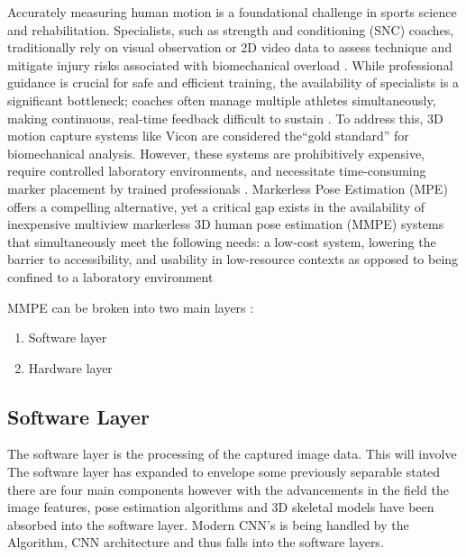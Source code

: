 \renewcommand{\labelenumii}{\arabic{enumi}.\arabic{enumii}}
\renewcommand{\labelenumiii}{\arabic{enumi}.\arabic{enumii}.\arabic{enumiii}}
\renewcommand{\labelenumiv}{\arabic{enumi}.\arabic{enumii}.\arabic{enumiii}.\arabic{enumiv}}

\label{chap:introduction}

\label{sec:background}

Accurately measuring human motion is a foundational challenge in sports science and rehabilitation. Specialists, such as strength and conditioning (SNC) coaches, traditionally rely on visual observation or 2D video data to assess technique and mitigate injury risks associated with biomechanical overload \cite{chariar2023ai,forte2023biomechanics}.
While professional guidance is crucial for safe and efficient training, the availability of specialists is a significant bottleneck; coaches often manage multiple athletes simultaneously, making continuous, real-time feedback difficult to sustain \cite{needham2021accuracy}.
To address this, 3D motion capture systems like Vicon are considered the``gold standard'' for biomechanical analysis\cite{matsuda2025reliability, hansen2024validation, song2022evolution}.
However, these systems are prohibitively expensive, require controlled laboratory environments, and necessitate time-consuming marker placement by trained professionals \cite{mercadal2024exercise,kuster2016accuracy}.
Markerless Pose Estimation (MPE) offers a compelling alternative, yet a critical gap exists in the availability of inexpensive multiview markerless 3D human pose estimation (MMPE) systems that simultaneously meet the following needs: a low-cost system, lowering the barrier to accessibility, and usability in low-resource contexts as opposed to being confined to a laboratory environment 

MMPE can be broken into two main layers \cite{wade2022applications}:
    \begin{enumerate}
        \item Software layer
        \item Hardware layer
    \end{enumerate}

\subsection{Software Layer}

The software layer is the processing of the captured image data. This will involve 
The software layer has expanded to envelope some previously separable 
\citet{colyer2018review} stated there are four main components however with the advancements in the field the image features, pose
estimation algorithms and 3D skeletal models have been absorbed into the software layer. Modern CNN's
is being handled by the Algorithm, CNN architecture and thus falls into the software layers.

